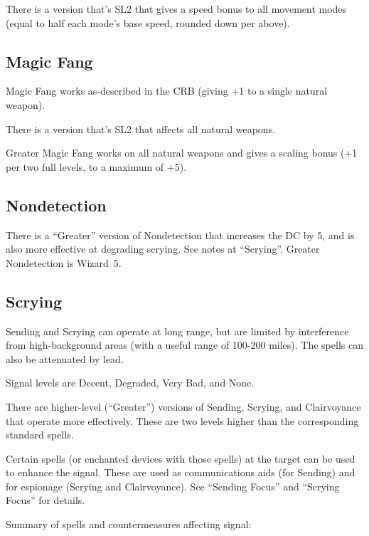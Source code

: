 There is a version that's SL2 that gives a speed bonus to all movement
modes (equal to half each mode's base speed, rounded down per above).
%

%
\subsection{Magic Fang}

Magic Fang works as-described in the CRB (giving +1 to a single natural
weapon).

There is a version that's SL2 that affects all natural weapons.

Greater Magic Fang works on all natural weapons and gives a scaling bonus
(+1 per two full levels, to a maximum of +5).
%

%
\subsection{Nondetection}

There is a ``Greater'' version of Nondetection that increases the DC by
5, and is also more effective at degrading scrying. See notes at
``Scrying''. Greater Nondetection is Wizard~5.
%

%
\subsection{Scrying}

Sending and Scrying can operate at long range, but are limited by
interference from high-background areas (with a useful range of 100-200
miles). The spells can also be attenuated by lead.

Signal levels are Decent, Degraded, Very Bad, and None.

There are higher-level (``Greater'') versions of Sending, Scrying, and
Clairvoyance that operate more effectively. These are two levels higher
than the corresponding standard spells.

Certain spells (or enchanted devices with those spells) at the target can
be used to enhance the signal. These are used as communications aids (for
Sending) and for espionage (Scrying and Clairvoyance). See ``Sending Focus''
and ``Scrying Focus'' for details.

Summary of spells and countermeasures affecting signal:

